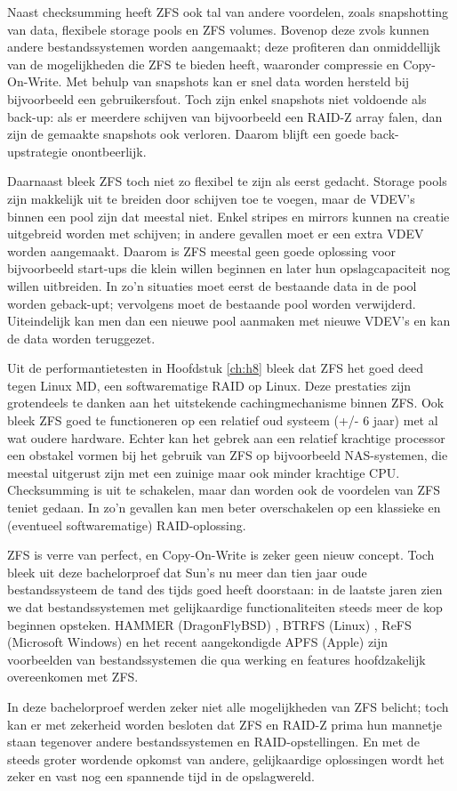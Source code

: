 Naast checksumming heeft ZFS ook tal van andere voordelen, zoals snapshotting van data, flexibele storage pools en ZFS volumes. Bovenop deze zvols kunnen andere bestandssystemen worden aangemaakt; deze profiteren dan onmiddellijk van de mogelijkheden die ZFS te bieden heeft, waaronder compressie en Copy-On-Write. Met behulp van snapshots kan er snel data worden hersteld bij bijvoorbeeld een gebruikersfout. Toch zijn enkel snapshots niet voldoende als back-up: als er meerdere schijven van bijvoorbeeld een RAID-Z array falen, dan zijn de gemaakte snapshots ook verloren. Daarom blijft een goede back-upstrategie onontbeerlijk.

Daarnaast bleek ZFS toch niet zo flexibel te zijn als eerst gedacht. Storage pools zijn makkelijk uit te breiden door schijven toe te voegen, maar de VDEV's binnen een pool zijn dat meestal niet. Enkel stripes en mirrors kunnen na creatie uitgebreid worden met schijven; in andere gevallen moet er een extra VDEV worden aangemaakt. Daarom is ZFS meestal geen goede oplossing voor bijvoorbeeld start-ups die klein willen beginnen en later hun opslagcapaciteit nog willen uitbreiden. In zo'n situaties moet eerst de bestaande data in de pool worden geback-upt; vervolgens moet de bestaande pool worden verwijderd. Uiteindelijk kan men dan een nieuwe pool aanmaken met nieuwe VDEV's en kan de data worden teruggezet.

Uit de performantietesten in Hoofdstuk \ref{ch:h8} bleek dat ZFS het goed deed tegen Linux MD, een softwarematige RAID op Linux. Deze prestaties zijn grotendeels te danken aan het uitstekende cachingmechanisme binnen ZFS. Ook bleek ZFS goed te functioneren op een relatief oud systeem (+/- 6 jaar) met al wat oudere hardware. Echter kan het gebrek aan een relatief krachtige processor een obstakel vormen bij het gebruik van ZFS op bijvoorbeeld NAS-systemen, die meestal uitgerust zijn met een zuinige maar ook minder krachtige CPU. Checksumming is uit te schakelen, maar dan worden ook de voordelen van ZFS teniet gedaan. In zo'n gevallen kan men beter overschakelen op een klassieke en (eventueel softwarematige) RAID-oplossing.

ZFS is verre van perfect, en Copy-On-Write is zeker geen nieuw concept. Toch bleek uit deze bachelorproef dat Sun's nu meer dan tien jaar oude bestandssysteem de tand des tijds goed heeft doorstaan: in de laatste jaren zien we dat bestandssystemen met gelijkaardige functionaliteiten steeds meer de kop beginnen opsteken. HAMMER (DragonFlyBSD) \autocite{DragonFlyBSD2017}, BTRFS (Linux) \autocite{BTRFSProject2017}, ReFS (Microsoft Windows) \autocite{Microsoft2016} en het recent aangekondigde APFS (Apple) \autocite{Apple2017} zijn voorbeelden van bestandssystemen die qua werking en features hoofdzakelijk overeenkomen met ZFS.

In deze bachelorproef werden zeker niet alle mogelijkheden van ZFS belicht; toch kan er met zekerheid worden besloten dat ZFS en RAID-Z prima hun mannetje staan tegenover andere bestandssystemen en RAID-opstellingen. En met de steeds groter wordende opkomst van andere, gelijkaardige oplossingen wordt het zeker en vast nog een spannende tijd in de opslagwereld.
